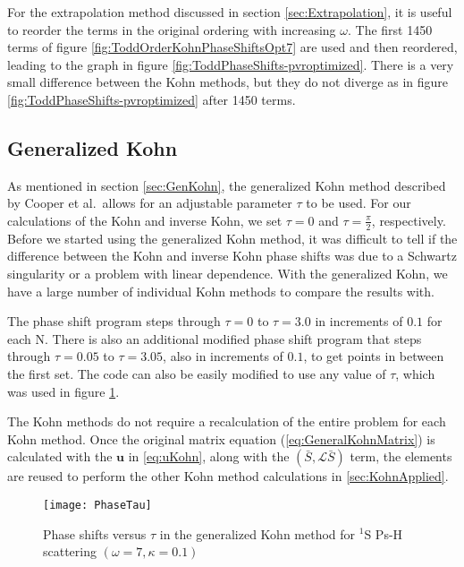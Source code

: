 \documentclass[Dissertation.tex]{subfiles}
\begin{document}
For the extrapolation method discussed in section \ref{sec:Extrapolation}, it is useful to reorder the terms in the original ordering with increasing $\omega$. The first 1450 terms of figure \ref{fig:ToddOrderKohnPhaseShiftsOpt7} are used and then reordered, leading to the graph in figure \ref{fig:ToddPhaseShifts-pvroptimized}. There is a very small difference between the Kohn methods, but they do not diverge as in figure \ref{fig:ToddPhaseShifts-pvroptimized} after 1450 terms.




\subsection{Generalized Kohn}
\label{sec:CompGenKohn}
As mentioned in section \ref{sec:GenKohn}, the generalized Kohn method described by Cooper et al.\ allows for an adjustable parameter $\tau$ to be used. For our calculations of the Kohn and inverse Kohn, we set $\tau = 0$ and $\tau = \frac{\pi}{2}$, respectively. Before we started using the generalized Kohn method, it was difficult to tell if the difference between the Kohn and inverse Kohn phase shifts was due to a Schwartz singularity or a problem with linear dependence. With the generalized Kohn, we have a large number of individual Kohn methods to compare the results with.

The phase shift program steps through $\tau = 0$ to $\tau = 3.0$ in increments of $0.1$ for each N. There is also an additional modified phase shift program that steps through $\tau = 0.05$ to $\tau = 3.05$, also in increments of $0.1$, to get points in between the first set. The code can also be easily modified to use any value of $\tau$, which was used in figure \ref{fig:PhaseTau}.

The Kohn methods do not require a recalculation of the entire problem for each Kohn method. Once the original matrix equation (\cref{eq:GeneralKohnMatrix}) is calculated with the $\textbf{u}$ in \cref{eq:uKohn}, along with the $(\bar{S},\mathcal{L} \bar{S})$ term, the elements are reused to perform the other Kohn method calculations in \cref{sec:KohnApplied}.



\setlength{\abovecaptionskip}{0pt}   %

\begin{figure}[H]
	\centering
	\texttt{[image: PhaseTau]}
	\caption[Phase shifts versus $\tau$ in the generalized Kohn method]{Phase shifts versus $\tau$ in the generalized Kohn method for $^1$S Ps-H scattering $(\omega = 7, \kappa = 0.1)$}
	\label{fig:PhaseTau}
\end{figure}
\end{document}
